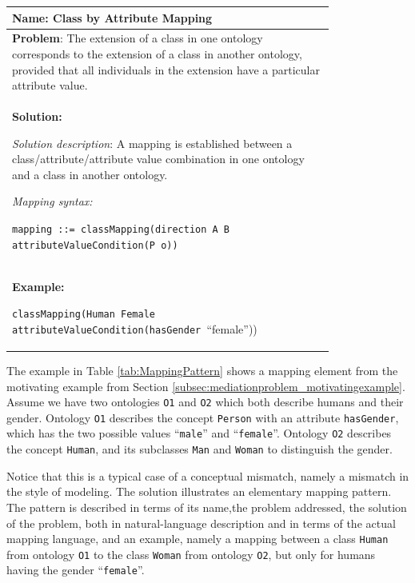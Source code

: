 \begin{center}
\label{tab:MappingPattern}
\tablehead{}
\begin{supertabular}{|m{0.8\linewidth}|}
\hline
\textbf{Name}: Class by Attribute Mapping \\\hline
\textbf{Problem}: The extension of a class in one ontology
corresponds to the extension of a class in another ontology, provided
that all individuals in the extension have a particular attribute
value. \\\hline
\textbf{Solution:} 

\textit{Solution description}: A mapping is established
between a class/attribute/attribute value combination in one ontology
and a class in another ontology. 

\textit{Mapping syntax:} 

\texttt{mapping ::= classMapping(direction A
B attributeValueCondition(P o))} \\\hline
\textbf{Example:} 

\texttt{classMapping(Human Female
attributeValueCondition(hasGender
}{\textquotedblleft}female{\textquotedblright})) \\\hline
\end{supertabular}
\end{center}

The example in Table \ref{tab:MappingPattern} \cite{debruin2005wsml} shows a mapping element from the
motivating example from Section \ref{subsec:mediationproblem_motivatingexample}. Assume we have two ontologies
\texttt{O1} and \texttt{O2} which both
describe humans and their gender. Ontology \texttt{O1}
describes the concept \texttt{Person} with an attribute
\texttt{hasGender}, which has the two possible values
{\textquotedblleft}\texttt{male}{\textquotedblright} and
{\textquotedblleft}\texttt{female}{\textquotedblright}.
Ontology \texttt{O2} describes the concept
\texttt{Human}, and its subclasses
\texttt{Man} and \texttt{Woman} to
distinguish the gender.

Notice that this is a typical case of a
conceptual mismatch, namely a mismatch in the style of modeling. The
solution illustrates an elementary mapping pattern. The pattern is
described in terms of its name,the problem addressed, the solution of
the problem, both in natural-language description and in terms of the
actual mapping language, and an example, namely a mapping between a
class \texttt{Human} from ontology
\texttt{O1} to the class \texttt{Woman} from
ontology \texttt{O2}, but only for humans having the
gender
{\textquotedblleft}\texttt{female}{\textquotedblright}.

